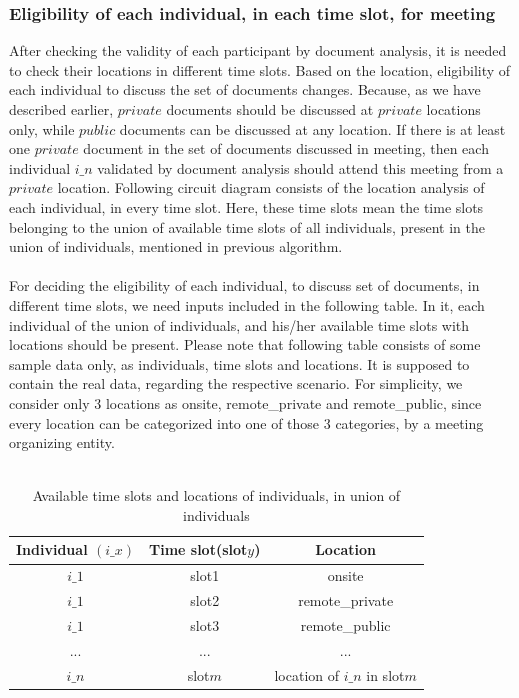 \subsubsection{Eligibility of each individual, in each time slot, for meeting}
After checking the validity of each participant by document analysis, it is needed to check their locations in different time slots. Based on the location, eligibility of each individual to discuss the set of documents changes. Because, as we have described earlier, $private$ documents should be discussed at $private$ locations only, while $public$ documents can be discussed at any location. If there is at least one $private$ document in the set of documents discussed in meeting, then each individual $i\_n$ validated by document analysis should attend this meeting from a $private$ location. Following circuit diagram consists of the location analysis of each individual, in every time slot. Here, these time slots mean the time slots belonging to the union of available time slots of all individuals, present in the union of individuals, mentioned in previous algorithm.\\ \\ 
For deciding the eligibility of each individual, to discuss set of documents, in different time slots, we need inputs included in the following table. In it, each individual of the union of individuals, and his/her available time slots with locations should be present. Please note that following table consists of some sample data only, as individuals, time slots and locations. It is supposed to contain the real data, regarding the respective scenario. For simplicity, we consider only 3 locations as onsite, remote\_private and remote\_public, since every location can be categorized into one of those 3 categories, by a meeting organizing entity.\\ \\
\begin{table}[H]
    \centering
    \begin{tabular}{|c|c|c|}
    \hline
    Individual $(i\_x)$ & Time slot(slot$y$) & Location \\
    \hline
    $i\_1$ & slot1 & onsite \\
    \hline
    $i\_1$ & slot2 & remote\_private \\
    \hline
    $i\_1$ & slot3 & remote\_public \\
    \hline
    ... & ... & ... \\
    \hline
    $i\_n$ & slot$m$ & location of $i\_n$ in slot$m$ \\
    \hline
    \end{tabular}
    \caption{Available time slots and locations of individuals, in union of individuals}
    \label{tab:three_columns_six_rows}
\end{table}

